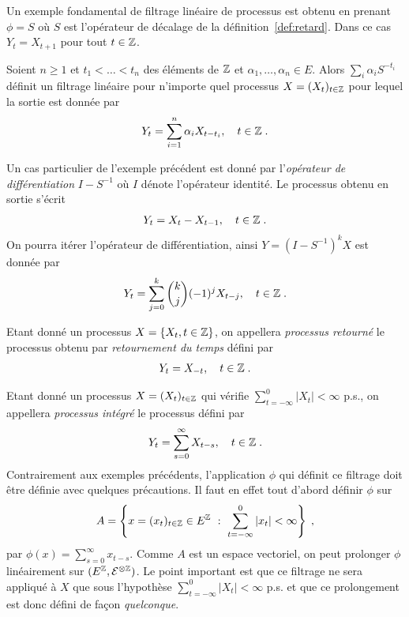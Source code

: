 \begin{example}[D\'ecalage]
\label{exple:decalage}
  Un exemple fondamental de filtrage lin\'eaire de processus est obtenu en
  prenant $\phi=S$ o\`u $S$ est l'op\'erateur de d\'ecalage de la
  d\'efinition~\ref{def:retard}. Dans ce cas $Y_t=X_{t+1}$ pour tout $t\in \mathbb{Z}$.
\end{example}


\begin{example}
\label{exple:rif}
  Soient $n\geq1$ et $t_1<\dots < t_n$ des \'el\'ements de $\mathbb{Z}$ et
  $\alpha_1,\dots,\alpha_n\in E$. Alors $\sum_i\alpha_i S^{-t_i}$ d\'efinit un
  filtrage lin\'eaire pour n'importe quel processus $X=(X_t)_{t\in \mathbb{Z}}$ pour
  lequel la sortie est donn\'ee par
$$
Y_t=\sum_{i=1}^n\alpha_i X_{t-t_i},\quad t\in \mathbb{Z} \; .
$$
\end{example}
\begin{example}
\label{exple:diff}
Un cas particulier de l'exemple pr\'ec\'edent est donn\'e par l'\emph{op\'erateur de diff\'erentiation} $I-S^{-1}$ o\`u $I$ d\'enote l'op\'erateur
identit\'e. Le processus obtenu en sortie s'\'ecrit
$$
Y_t=X_t-X_{t-1},\quad t\in \mathbb{Z} \; .
$$
On pourra it\'erer l'op\'erateur de diff\'erentiation, ainsi $Y=(I-S^{-1})^kX$ est
donn\'ee par
$$
Y_t=\sum_{j=0}^k {{k}\choose{j}} (-1)^j X_{t-j} ,\quad t\in \mathbb{Z} \; .
$$
\end{example}
\begin{example}
\label{exple:time_reversion}
Etant donn\'e un processus  $X=\{X_t, t\in \mathbb{Z}\}$, on appellera \emph{processus retourn\'e} le processus obtenu par
\emph{retournement du temps} d\'efini par
$$
Y_t=X_{-t},\quad t\in \mathbb{Z} \; .
$$
\end{example}
\begin{example}
\label{exple:time_integration}
  Etant donn\'e un processus $X=(X_t)_{t\in \mathbb{Z}}$ qui v\'erifie
  $\sum_{t=-\infty}^0|X_t|<\infty$ p.s., on appellera \emph{processus int\'egr\'e}
  le processus d\'efini par
$$
Y_t=\sum_{s=0}^\infty X_{t-s},\quad t\in \mathbb{Z} \; .
$$
Contrairement aux exemples pr\'ec\'edents, l'application $\phi$ qui d\'efinit ce
filtrage doit \^{e}tre d\'efinie avec quelques pr\'ecautions. Il faut en effet tout
d'abord d\'efinir $\phi$ sur
$$
A=\left\{x=(x_t)_{t\in \mathbb{Z}}\in E^{\mathbb{Z}}~:~\sum_{t=-\infty}^0|x_t|<\infty\right\}\;,
$$
par $\phi(x)=\sum_{s=0}^\infty x_{t-s}$. Comme $A$ est un espace vectoriel, on
peut prolonger $\phi$ lin\'eairement sur $(E^{\mathbb{Z}},\mathcal{E}^{\otimes \mathbb{Z}})$. Le
point important est que ce filtrage ne sera appliqu\'e \`a $X$ que sous l'hypoth\`ese
$\sum_{t=-\infty}^0|X_t|<\infty$ p.s. et que ce prolongement est donc d\'efini de
fa\c{c}on \emph{quelconque}.
\end{example}

